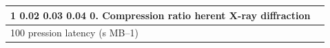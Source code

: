 \begin{tabular}{ll}
\toprule
1 0.02 0.03 0.04 0. Compression ratio herent X-ray diffraction &  \\
\midrule
100 pression latency (s MB–1) &  \\
\bottomrule
\end{tabular}
